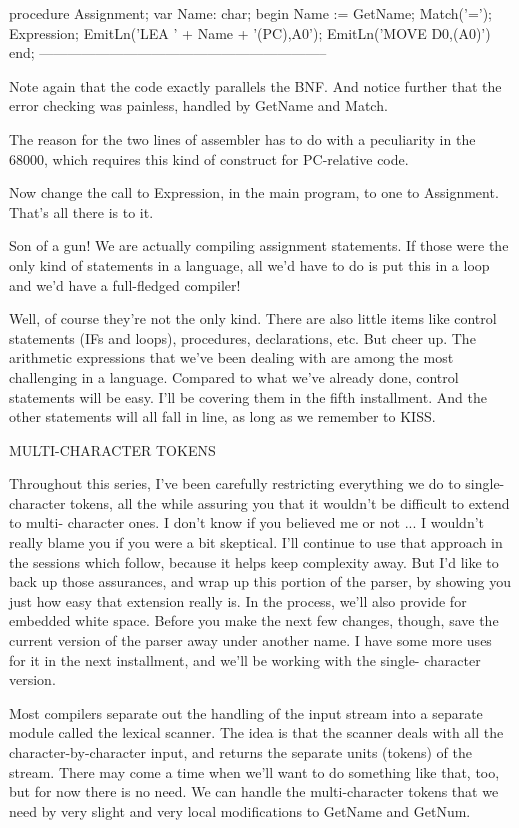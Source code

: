\documentclass[float=false, crop=false]{standalone}
\begin{document}
procedure Assignment;
var Name: char;
begin
   Name := GetName;
   Match('=');
   Expression;
   EmitLn('LEA ' + Name + '(PC),A0');
   EmitLn('MOVE D0,(A0)')
end;
{--------------------------------------------------------------}


Note again that the  code  exactly parallels the BNF.  And notice
further that  the error checking was painless, handled by GetName
and Match.

The reason for the two  lines  of  assembler  has  to  do  with a
peculiarity in the  68000,  which requires this kind of construct
for PC-relative code.

Now change the call to Expression, in the main program, to one to
Assignment.  That's all there is to it.

Son of a gun!  We are actually  compiling  assignment statements.
If those were the only kind of statements in a language, all we'd
have to  do  is  put  this in a loop and we'd have a full-fledged
compiler!

Well, of course they're not the only kind.  There are also little
items  like  control  statements  (IFs  and  loops),  procedures,
declarations, etc.  But cheer  up.    The  arithmetic expressions
that we've been dealing with are among the most challenging  in a
language.      Compared  to  what  we've  already  done,  control
statements  will be easy.  I'll be covering  them  in  the  fifth
installment.  And the other statements will all fall in  line, as
long as we remember to KISS.


MULTI-CHARACTER TOKENS

Throughout this series, I've been carefully restricting everything we do to
single-character tokens, all the while assuring you that it wouldn't be
difficult to extend to multi- character ones. I don't know if you believed me or
not ... I wouldn't really blame you if you were a bit skeptical. I'll continue
to use that approach in the sessions which follow, because it helps keep
complexity away. But I'd like to back up those assurances, and wrap up this
portion of the parser, by showing you just how easy that extension really is. In
the process, we'll also provide for embedded white space. Before you make the
next few changes, though, save the current version of the parser away under
another name. I have some more uses for it in the next installment, and we'll be
working with the single- character version.

Most compilers separate out the handling of the input stream into a separate
module called the lexical scanner. The idea is that the scanner deals with all
the character-by-character input, and returns the separate units (tokens) of the
stream. There may come a time when we'll want to do something like that, too,
but for now there is no need. We can handle the multi-character tokens that we
need by very slight and very local modifications to GetName and GetNum.
\end{document}
